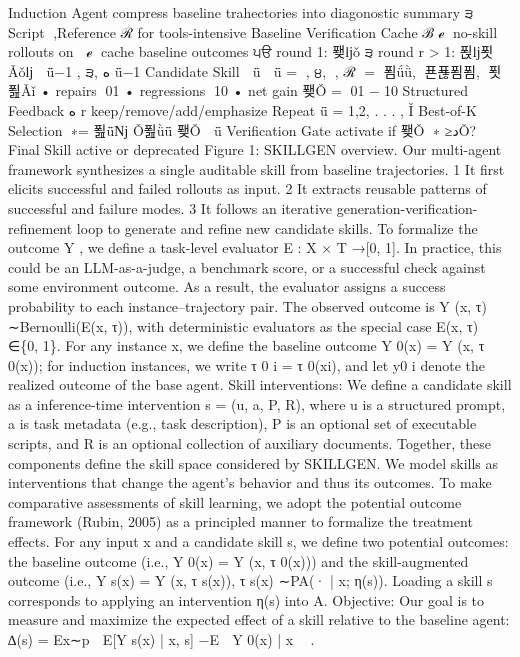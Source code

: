 Induction Agent
compress baseline trahectories into 
diagonostic summary ੩
Script ੟,Reference ℛ for tools-intensive
Baseline Verification Cache ℬ੿ℯ੻
no-skill rollouts on ੓੿ℯ੻
cache baseline outcomes ੫ੳ
round 1: 퐺ǉǒ ੩ 
round r > 1: 푅ǉ푓Ǎǒǉ ੢ ǖ−1 , ੩, ه ǖ−1  
Candidate Skill ੢ ǖ 
੢ ǖ =  ੾, ੪, ੟, ℛ 
੤=  ੤푐ǘǜ, ੤푠푢푐푐, ੤푓푎Ǎǐ 
•
repairs ੷01
•
regressions ੷10
•
net gain 퐺Ǒ = ੷01 −੷10
Structured Feedback ه r  
keep/remove/add/emphasize
Repeat ǖ = 1,2, . . . , Ǐ
Best-of-K 
Selection
੢∗= 푎ǖǋ Ǒ푎ǜǖ 퐺Ǒ ੢ ǖ  
Verification Gate
activate if
 퐺Ǒ ੢∗ ≥دǑ?
Final Skill
active or deprecated
Figure 1: SKILLGEN overview. Our multi-agent framework synthesizes a single auditable skill from
baseline trajectories.
1 It first elicits successful and failed rollouts as input.
2 It extracts reusable
patterns of successful and failure modes.
3 It follows an iterative generation-verification-refinement
loop to generate and refine new candidate skills.
To formalize the outcome Y , we define a task-level evaluator E : X × T →[0, 1]. In practice, this
could be an LLM-as-a-judge, a benchmark score, or a successful check against some environment
outcome. As a result, the evaluator assigns a success probability to each instance–trajectory pair. The
observed outcome is Y (x, τ) ∼Bernoulli(E(x, τ)), with deterministic evaluators as the special case
E(x, τ) ∈\{0, 1\}. For any instance x, we define the baseline outcome Y 0(x) = Y (x, τ 0(x)); for
induction instances, we write τ 0
i = τ 0(xi), and let y0
i denote the realized outcome of the base agent.
Skill interventions: We define a candidate skill as a inference-time intervention s = (u, a, P, R),
where u is a structured prompt, a is task metadata (e.g., task description), P is an optional set
of executable scripts, and R is an optional collection of auxiliary documents. Together, these
components define the skill space considered by SKILLGEN.
We model skills as interventions that change the agent’s behavior and thus its outcomes. To make
comparative assessments of skill learning, we adopt the potential outcome framework (Rubin, 2005)
as a principled manner to formalize the treatment effects. For any input x and a candidate skill
s, we define two potential outcomes: the baseline outcome (i.e., Y 0(x) = Y (x, τ 0(x))) and the
skill-augmented outcome (i.e., Y s(x) = Y (x, τ s(x)), τ s(x) ∼PA(· | x; η(s)). Loading a skill s
corresponds to applying an intervention η(s) into A.
Objective: Our goal is to measure and maximize the expected effect of a skill relative to the baseline
agent:
∆(s) = Ex∼p

E[Y s(x) | x, s] −E

Y 0(x) | x

.
